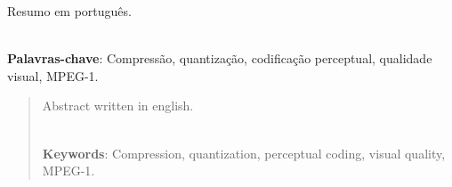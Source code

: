 \documentclass{ufpatcc}
\begin{document}
 \begin{ufpaResumo}

 
Resumo em português.

\noindent \\
\textbf{Palavras-chave}: Compressão, quantização, codificação perceptual, qualidade visual, MPEG-1.

\end{ufpaResumo}

\begin{abstract}


Abstract written in english.

\noindent \\
\textbf{Keywords}: Compression, quantization, perceptual coding, visual quality, MPEG-1.

\end{abstract}


 
 \markright{}
 \listoffigures
 \thispagestyle{myheadings} 
 \clearpage
   
 \markright{}
 \listoftables
 \thispagestyle{myheadings}
 \clearpage
 
 \markright{}

\begin{listAbbreviation}

\begin{acronym}
\footnotesize
{}


\end{acronym}

%   
\end{listAbbreviation}
 \thispagestyle{myheadings} 
 \clearpage
\end{document}
